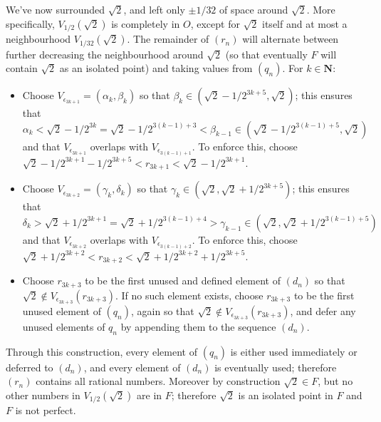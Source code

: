 \begin{solution}
{We've now surrounded \(\sqrt{2}\), and left only \(\pm 1/32\) of space around \(\sqrt{2}\). More specifically, \(V_{1/2}(\sqrt{2})\) is completely in \(O\), except for \(\sqrt{2}\) itself and at most a neighbourhood \(V_{1/32}(\sqrt{2})\). The remainder of \((r_n)\) will alternate between further decreasing the neighbourhood around \(\sqrt{2}\) (so that eventually \(F\) will contain \(\sqrt{2}\) as an isolated point) and taking values from \((q_n)\). For \(k \in \mathbf{N}\):

\begin{itemize}
    \item Choose \(V_{\epsilon_{3k + 1}} = (\alpha_k, \beta_k)\) so that \(\beta_k \in (\sqrt{2} - 1 / 2^{3k + 5}, \sqrt{2})\); this ensures that \(\alpha_k < \sqrt{2} - 1/2^{3k} = \sqrt{2} - 1/2 ^ {3(k-1) + 3} < \beta_{k-1} \in (\sqrt{2} - 1/2^{3(k-1) + 5}, \sqrt{2})\) and that \(V_{\epsilon_{3k + 1}}\) overlaps with \(V_{\epsilon_{3(k-1) + 1}}\). To enforce this, choose  \(\sqrt{2} - 1/2^{3k+1} - 1/2^{3k + 5} < r_{3k + 1} < \sqrt{2} - 1 / 2^{3k + 1} \).

    \item Choose \(V_{\epsilon_{3k + 2}} = (\gamma_k, \delta_k)\) so that \(\gamma_k \in (\sqrt{2}, \sqrt{2} + 1 / 2^{3k + 5})\); this ensures that \(\delta_k > \sqrt{2} + 1/2^{3k + 1} = \sqrt{2} + 1/2 ^ {3(k-1) + 4} > \gamma_{k-1} \in (\sqrt{2}, \sqrt{2} + 1/2^{3(k-1) + 5})\) and that \(V_{\epsilon_{3k + 2}}\) overlaps with \(V_{\epsilon_{3(k-1) + 2}}\). To enforce this, choose  \(\sqrt{2} + 1/2^{3k+2} < r_{3k + 2} < \sqrt{2} + 1 / 2^{3k + 2} + 1/2^{3k + 5} \).

    \item Choose \(r_{3k + 3}\) to be the first unused and defined element of \((d_n)\) so that \(\sqrt{2} \notin V_{\epsilon_{3k + 3}}(r_{3k + 3})\). If no such element exists, choose \(r_{3k + 3}\) to be the first unused element of \((q_n)\), again so that \(\sqrt{2} \notin V_{\epsilon_{3k + 3}}(r_{3k + 3})\), and defer any unused elements of \(q_n\) by appending them to the sequence \((d_n)\).
\end{itemize}

Through this construction, every element of \((q_n)\) is either used immediately or deferred to \((d_n)\), and every element of \((d_n)\) is eventually used; therefore \((r_n)\) contains all rational numbers. Moreover by construction \(\sqrt{2} \in F\), but no other numbers in \(V_{1/2}(\sqrt{2})\) are in \(F\); therefore \(\sqrt{2}\) is an isolated point in \(F\) and \(F\) is not perfect.

}
\end{solution}
